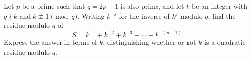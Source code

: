 Let $p$ be a prime such that $q=2p-1$ is also prime, and let $k$ be an integer with $q\nmid k$ and $k\not\equiv1\pmod q$. Writing $k^{-j}$ for the inverse of $k^j$ modulo $q$, find the residue modulo $q$ of
\[S=k^{-1}+k^{-2}+k^{-3}+\cdots+k^{-(p-1)}.\]
Express the answer in terms of $k$, distinguishing whether or not $k$ is a quadratic residue modulo $q$.
